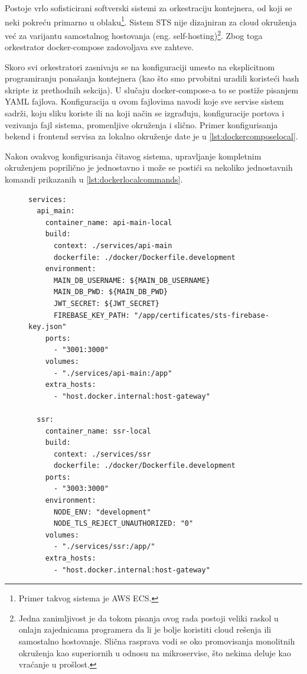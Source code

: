 \documentclass[12pt,oneside]{memoir}
\begin{document}
Postoje vrlo sofisticirani softverski sistemi za orkestraciju kontejnera, od koji se neki pokreću primarno u oblaku\footnote{Primer takvog sistema je AWS ECS.}. Sistem STS nije dizajniran za cloud okruženja već za varijantu samostalnog hostovanja (eng. self-hosting)\footnote{Jedna zanimljivost je da tokom pisanja ovog rada postoji veliki raskol u onlajn zajednicama programera da li je bolje koristiti cloud rešenja ili samostalno hostovanje. Slična rasprava vodi se oko promovisanja monolitnih okruženja kao superiornih u odnosu na mikroservise, što nekima deluje kao vraćanje u prošlost.}. Zbog toga orkestrator docker-compose zadovoljava sve zahteve.

Skoro svi orkestratori zasnivaju se na konfiguraciji umesto na eksplicitnom programiranju ponašanja kontejnera (kao što smo prvobitni uradili koristeći bash skripte iz prethodnih sekcija). U slučaju docker-compose-a to se postiže pisanjem YAML fajlova. Konfiguracija u ovom fajlovima navodi koje sve servise sistem sadrži, koju sliku koriste ili na koji način se izgrađuju, konfiguracije portova i vezivanja fajl sistema, promenljive okruženja i slično. Primer konfigurisanja bekend i frontend servisa za lokalno okruženje date je u \ref{lst:dockercomposelocal}.

Nakon ovakvog konfigurisanja čitavog sistema, upravljanje kompletnim okruženjem poprilično je jednostavno i može se postići sa nekoliko jednostavnih komandi prikazanih u \ref{lst:dockerlocalcommands}.

\begin{figure}[h]
\begin{lstlisting}[language=docker-compose, caption={docker-compose konfiguracija nekih razvojnih servisa.}, label={lst:dockercomposelocal}]
services:
  api_main:
    container_name: api-main-local
    build:
      context: ./services/api-main
      dockerfile: ./docker/Dockerfile.development
    environment:
      MAIN_DB_USERNAME: ${MAIN_DB_USERNAME}
      MAIN_DB_PWD: ${MAIN_DB_PWD}
      JWT_SECRET: ${JWT_SECRET}
      FIREBASE_KEY_PATH: "/app/certificates/sts-firebase-key.json"
    ports:
      - "3001:3000"
    volumes:
      - "./services/api-main:/app"
    extra_hosts:
      - "host.docker.internal:host-gateway"

  ssr:
    container_name: ssr-local
    build:
      context: ./services/ssr
      dockerfile: ./docker/Dockerfile.development
    ports:
      - "3003:3000"
    environment:
      NODE_ENV: "development"
      NODE_TLS_REJECT_UNAUTHORIZED: "0"
    volumes:
      - "./services/ssr:/app/"
    extra_hosts:
      - "host.docker.internal:host-gateway"
\end{lstlisting}
\end{figure}
\end{document}
